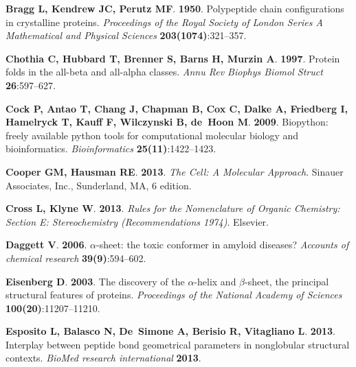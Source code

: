 \documentclass[fleqn,10pt,lineno]{wlpeerj} %
\begin{document}
\begin{thebibliography}{58}
\textbf{Bragg L, Kendrew JC, Perutz MF}. \textbf{1950}.
\newblock Polypeptide chain configurations in crystalline proteins.
\newblock \emph{Proceedings of the Royal Society of London Series A
  Mathematical and Physical Sciences} \textbf{203(1074)}:321--357.

\textbf{Chothia C, Hubbard T, Brenner S, Barns H, Murzin A}. \textbf{1997}.
\newblock Protein folds in the all-beta and all-alpha classes.
\newblock \emph{Annu Rev Biophys Biomol Struct} \textbf{26}:597--627.

\textbf{Cock P, Antao T, Chang J, Chapman B, Cox C, Dalke A, Friedberg I,
  Hamelryck T, Kauff F, Wilczynski B, de~Hoon M}. \textbf{2009}.
\newblock Biopython: freely available python tools for computational molecular
  biology and bioinformatics.
\newblock \emph{Bioinformatics} \textbf{25(11)}:1422--1423.

\textbf{Cooper GM, Hausman RE}. \textbf{2013}.
\newblock \emph{The Cell: A Molecular Approach}.
\newblock Sinauer Associates, Inc., Sunderland, MA, 6 edition.

\textbf{Cross L, Klyne W}. \textbf{2013}.
\newblock \emph{Rules for the Nomenclature of Organic Chemistry: Section E:
  Stereochemistry (Recommendations 1974)}.
\newblock Elsevier.

\textbf{Daggett V}. \textbf{2006}.
\newblock $\alpha$-sheet: the toxic conformer in amyloid diseases?
\newblock \emph{Accounts of chemical research} \textbf{39(9)}:594--602.

\textbf{Eisenberg D}. \textbf{2003}.
\newblock The discovery of the $\alpha$-helix and $\beta$-sheet, the principal
  structural features of proteins.
\newblock \emph{Proceedings of the National Academy of Sciences}
  \textbf{100(20)}:11207--11210.

\textbf{Esposito L, Balasco N, De~Simone A, Berisio R, Vitagliano L}.
  \textbf{2013}.
\newblock Interplay between peptide bond geometrical parameters in nonglobular
  structural contexts.
\newblock \emph{BioMed research international} \textbf{2013}.


\end{thebibliography}
\end{document}
